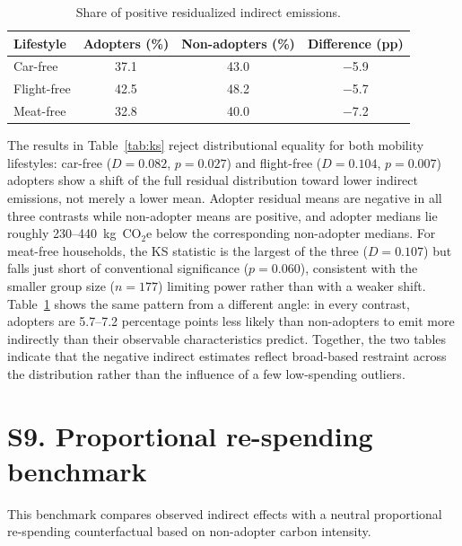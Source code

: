 \documentclass[12pt]{article}
\begin{document}
\begin{table}[!htbp]
\centering
\small
\caption{Share of positive residualized indirect emissions.}
\label{tab:share_positive}
\begin{tabular}{lccc}
\toprule
\textbf{Lifestyle} & \textbf{Adopters (\%)} & \textbf{Non-adopters (\%)} & \textbf{Difference (pp)} \\
\midrule
Car-free & 37.1 & 43.0 & $-$5.9 \\
Flight-free & 42.5 & 48.2 & $-$5.7 \\
Meat-free & 32.8 & 40.0 & $-$7.2 \\
\bottomrule
\end{tabular}
\end{table}

The results in Table~\ref{tab:ks} reject distributional equality for both mobility lifestyles: car-free ($D = 0.082$, $p = 0.027$) and flight-free ($D = 0.104$, $p = 0.007$) adopters show a shift of the full residual distribution toward lower indirect emissions, not merely a lower mean. Adopter residual means are negative in all three contrasts while non-adopter means are positive, and adopter medians lie roughly 230--440~kg~CO$_2$e below the corresponding non-adopter medians. For meat-free households, the KS statistic is the largest of the three ($D = 0.107$) but falls just short of conventional significance ($p = 0.060$), consistent with the smaller group size ($n = 177$) limiting power rather than with a weaker shift. Table~\ref{tab:share_positive} shows the same pattern from a different angle: in every contrast, adopters are 5.7--7.2 percentage points less likely than non-adopters to emit more indirectly than their observable characteristics predict. Together, the two tables indicate that the negative indirect estimates reflect broad-based restraint across the distribution rather than the influence of a few low-spending outliers.

\section*{S9. Proportional re-spending benchmark}

This benchmark compares observed indirect effects with a neutral proportional re-spending counterfactual based on non-adopter carbon intensity.
\end{document}
